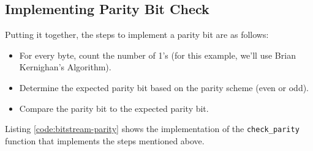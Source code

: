 \documentclass[main.tex]{subfiles}
\begin{document}
\subsection{Implementing Parity Bit Check}
Putting it together, the steps to implement a parity bit are as follows:
\begin{itemize}
    \item For every byte, count the number of 1's (for this example, we'll use Brian Kernighan's Algorithm).
    \item Determine the expected parity bit based on the parity scheme (even or odd).
    \item Compare the parity bit to the expected parity bit.
\end{itemize}

\noindent Listing \ref{code:bitstream-parity} shows the implementation of the \texttt{check\_parity} function that implements the steps mentioned above.


\end{document}
